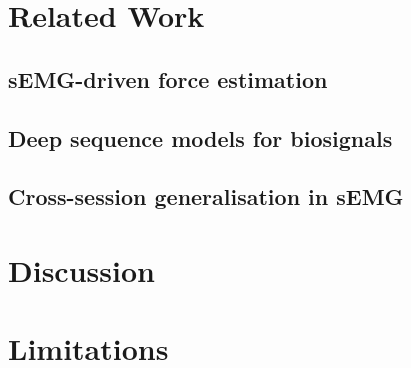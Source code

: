 \documentclass[journal]{IEEEtran}
\begin{document}
\section{Related Work}
\label{sec:related}
\subsection{sEMG-driven force estimation}

\subsection{Deep sequence models for biosignals}

\subsection{Cross-session generalisation in sEMG}




\section{Discussion}
\label{sec:discussion}

\section{Limitations}
\label{sec:limitations}
\end{document}
